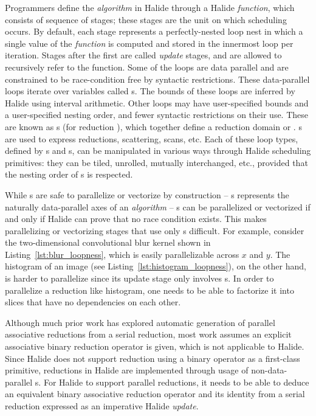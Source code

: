 Programmers define the \emph{algorithm} in Halide through a Halide \emph{function}, which consists of sequence of stages; these stages are the unit on which scheduling occurs. By default, each stage represents a perfectly-nested loop nest in which a single value of the \emph{function} is computed and stored in the innermost loop per iteration. Stages after the first are called \emph{update} stages, and are allowed to recursively refer to the function. Some of the loops are data parallel and are constrained to be race-condition free by syntactic restrictions. These data-parallel loops iterate over variables called s. The bounds of these loops are inferred by Halide using interval arithmetic.  Other loops may have user-specified bounds and a user-specified nesting order, and fewer syntactic restrictions on their use. These are known as s (for reduction ), which together define a reduction domain or . s are used to express reductions, scattering, scans, etc. Each of these loop types, defined by s and s, can be manipulated in various ways through Halide scheduling primitives: they can be tiled, unrolled, mutually interchanged, etc., provided that the nesting order of s is respected. 

While s are safe to parallelize or vectorize by construction -- s represents the naturally data-parallel axes of an \emph{algorithm} -- s can be parallelized or vectorized if and only if Halide can prove that no race condition exists. This makes parallelizing or vectorizing stages that use only s difficult. For example, consider the two-dimensional convolutional blur kernel shown in Listing~\ref{lst:blur_loopness}, which is easily parallelizable across  $x$ and $y$. The histogram of an image (see Listing~\ref{lst:histogram_loopness}), on the other hand, is harder to parallelize since its update stage only involves s. In order to parallelize a reduction like histogram, one needs to be able to factorize it into slices that have no dependencies on each other.

Although much prior work has explored automatic generation of parallel associative reductions from a serial reduction, most work assumes an explicit associative binary reduction operator is given, which is not applicable to Halide. Since Halide does not support reduction using a binary operator as a first-class primitive, reductions in Halide are implemented through usage of non-data-parallel s. For Halide to support parallel reductions, it needs to be able to deduce an equivalent binary associative reduction operator and its identity from a serial reduction expressed as an imperative Halide \emph{update}. 


